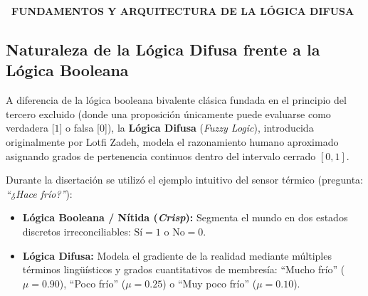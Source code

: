 \documentclass[12pt,a4paper]{article}
\newcommand{\llav}{\symbol{60}\symbol{60}}
\newcommand{\rlav}{\symbol{62}\symbol{62}}
\newcommand{\marcador}[1]{\llav\ #1\ \rlav}
\newcommand{\seccion}[1]{%
  \vspace{0.65cm}%
  {\centering\bfseries\fontsize{12pt}{14pt}\selectfont\marcador{\MakeUppercase{#1}}\par}%
  \vspace{0.30cm}%
}
\begin{document}
\seccion{FUNDAMENTOS Y ARQUITECTURA DE LA LÓGICA DIFUSA}

\subsection*{Naturaleza de la Lógica Difusa frente a la Lógica Booleana}
A diferencia de la lógica booleana bivalente clásica fundada en el principio del tercero excluido (donde una proposición únicamente puede evaluarse como verdadera [$1$] o falsa [$0$]), la \textbf{Lógica Difusa} (\textit{Fuzzy Logic}), introducida originalmente por Lotfi Zadeh, modela el razonamiento humano aproximado asignando grados de pertenencia continuos dentro del intervalo cerrado $[0, 1]$.

Durante la disertación se utilizó el ejemplo intuitivo del sensor térmico (pregunta: \textit{``¿Hace frío?''}):
\begin{itemize}
    \item \textbf{Lógica Booleana / Nítida (\textit{Crisp}):} Segmenta el mundo en dos estados discretos irreconciliables: $\text{Sí} = 1$ o $\text{No} = 0$.
    \item \textbf{Lógica Difusa:} Modela el gradiente de la realidad mediante múltiples términos lingüísticos y grados cuantitativos de membresía: ``Mucho frío'' ($\mu = 0.90$), ``Poco frío'' ($\mu = 0.25$) o ``Muy poco frío'' ($\mu = 0.10$).
\end{itemize}
\end{document}
